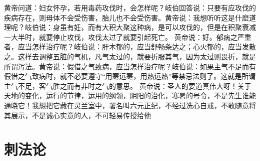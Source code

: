 \documentclass[12pt,UTF8]{ctexbook}
\begin{document}
黄帝问道：妇女怀孕，若用毒药攻伐时，会怎样呢？岐伯回答说：只要有应攻伐的疾病存在，则母体不会受伤害，胎儿也不会受伤害。黄帝说：我想听听这是什麽道理呢？岐伯说：身虽有妊，而有大积大聚这种病，是可以攻伐的，但是在积聚衰减一大半时，就要停止攻伐，攻伐太过了就要引起死亡。
黄帝说：好。郁病之严重者，应当怎样治疗呢？岐伯说：肝木郁的，应当舒畅条达之；心火郁的，应当发散之。这样去调整五脏的气机，凡气太过的，就要折服其气，因为太过则畏折，就是所谓泻法。黄帝说：假借之气致病，应当怎样治疗呢？岐伯说：如果主气不足而有假借之气致病时，就不必要遵守“用寒远寒，用热远热”等禁忌法则了。这就是所谓主气不足，客气胜之而有非时之气的意思。
黄帝说：圣人的要道真伟大呀！关于天地的变化，运行的节律，运用的纲领，阴阳的治化，寒暑的号令，不是先生谁能通晓它！我想把它藏在灵兰室中，署名叫六元正纪，不经过洗心自戒，不敢随意将其展示，不是诚心实意的人，不可轻易传授给他

\chapter{刺法论}
\end{document}
